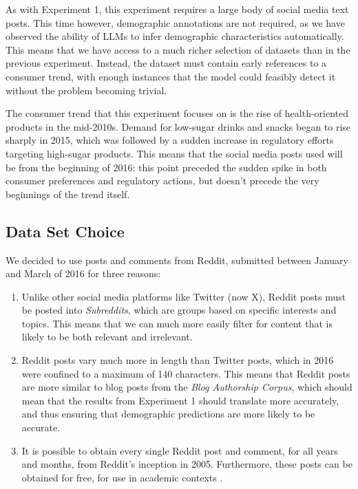\documentclass{report}
\begin{document}
As with Experiment 1, this experiment requires a large body of social media text posts. This time however, demographic annotations are not required, as we have observed the ability of LLMs to infer demographic characteristics automatically. This means that we have access to a much richer selection of datasets than in the previous experiment. Instead, the dataset must contain early references to a consumer trend, with enough instances that the model could feasibly detect it without the problem becoming trivial.

The consumer trend that this experiment focuses on is the rise of health-oriented products in the mid-2010s. Demand for low-sugar drinks and snacks began to rise sharply in 2015, which was followed by a sudden increase in regulatory efforts targeting high-sugar products\cite{popkin2016sweetening}. This means that the social media posts used will be from the beginning of 2016: this point preceded the sudden spike in both consumer preferences and regulatory actions, but doesn't precede the very beginnings of the trend itself.


\subsection{Data Set Choice}

We decided to use posts and comments from Reddit, submitted between January and March of 2016 for three reasons:

\begin{enumerate}
\item Unlike other social media platforms like Twitter (now X), Reddit posts must be posted into \textit{Subreddits}, which are groups based on specific interests and topics. This means that we can much more easily filter for content that is likely to be both relevant and irrelevant.

\item Reddit posts vary much more in length than Twitter posts, which in 2016 were confined to a maximum of 140 characters. This means that Reddit posts are more similar to blog posts from the \textit{Blog Authorship Corpus}, which should mean that the results from Experiment 1 should translate more accurately, and thus ensuring that demographic predictions are more likely to be accurate.

\item It is possible to obtain every single Reddit post and comment, for all years and months, from Reddit's inception in 2005. Furthermore, these posts can be obtained for free, for use in academic contexts \cite{watchful1_reddit_2016-torrent-site}.
\end{enumerate}
\end{document}
